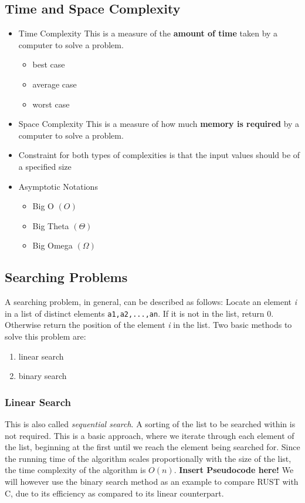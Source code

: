 \documentclass{article}
\begin{document}
\subsection{Time and Space Complexity}
\begin{itemize}
    \item Time Complexity \textrightarrow This is a measure of the \textbf{amount of time} taken by a computer to solve a problem. 
    \begin{itemize}
        \item best case
        \item average case
        \item worst case
    \end{itemize}
    \item Space Complexity \textrightarrow This is a measure of how much \textbf{memory is required} by a computer to solve a problem.
    \item Constraint for both types of complexities is that the input values should be of a specified size
    \item Asymptotic Notations
    \begin{itemize}
        \item Big O $(O)$
        \item Big Theta $(\Theta)$
        \item Big Omega $(\Omega)$
    \end{itemize}
\end{itemize} 

\subsection{Searching Problems}
A searching problem, in general, can be described as follows:
Locate an element \textit{i} in a list of distinct elements \texttt{a1,a2,...,an}. If it is not in the list, return $0$. Otherwise return the position of the element \textit{i} in the list.
Two basic methods to solve this problem are:
\begin{enumerate}
    \item linear search
    \item binary search 
\end{enumerate}

\subsubsection{Linear Search}
This is also called \textit{sequential search}. A sorting of the list to be searched within is not required. This is a basic approach, where we iterate through each element of the list, beginning at the first until we reach the element being searched for. Since the running time of the algorithm scales proportionally with the size of the list, the time complexity of the algorithm is \textit{$O(n)$}. \newline \newline
\textbf{Insert Pseudocode here!} \newline\newline
We will however use the binary search method as an example to compare RUST with C, due to its efficiency as compared to its linear counterpart.
\end{document}
